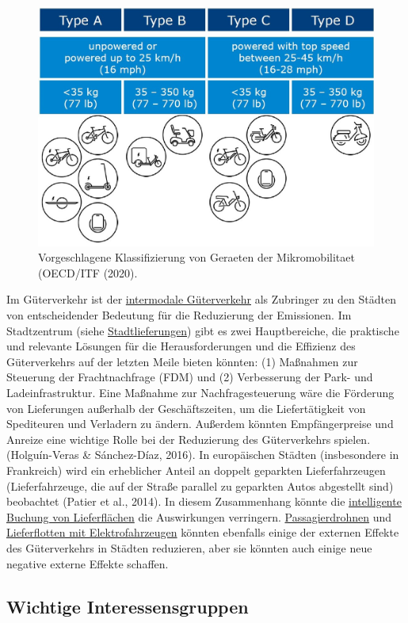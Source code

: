 \documentclass[
]{book}
\begin{document}
\begin{figure}
\includegraphics[width=0.5\linewidth]{image/micromobility_classes} \caption{Vorgeschlagene Klassifizierung von Geraeten der Mikromobilitaet (OECD/ITF (2020).}\label{fig:unnamed-chunk-24}
\end{figure}

Im Güterverkehr ist der \protect\hyperlink{intermodal_freight}{intermodale Güterverkehr} als Zubringer zu den Städten von entscheidender Bedeutung für die Reduzierung der Emissionen. Im Stadtzentrum (siehe \protect\hyperlink{urban_delivery}{Stadtlieferungen}) gibt es zwei Hauptbereiche, die praktische und relevante Lösungen für die Herausforderungen und die Effizienz des Güterverkehrs auf der letzten Meile bieten könnten: (1) Maßnahmen zur Steuerung der Frachtnachfrage (FDM) und (2) Verbesserung der Park- und Ladeinfrastruktur. Eine Maßnahme zur Nachfragesteuerung wäre die Förderung von Lieferungen außerhalb der Geschäftszeiten, um die Liefertätigkeit von Spediteuren und Verladern zu ändern. Außerdem könnten Empfängerpreise und Anreize eine wichtige Rolle bei der Reduzierung des Güterverkehrs spielen. (Holguín-Veras \& Sánchez-Díaz, 2016). In europäischen Städten (insbesondere in Frankreich) wird ein erheblicher Anteil an doppelt geparkten Lieferfahrzeugen (Lieferfahrzeuge, die auf der Straße parallel zu geparkten Autos abgestellt sind) beobachtet (Patier et al., 2014). In diesem Zusammenhang könnte die \protect\hyperlink{space_book}{intelligente Buchung von Lieferflächen} die Auswirkungen verringern. \protect\hyperlink{passenger_drones}{Passagierdrohnen} und \protect\hyperlink{electric_delivery_fleets}{Lieferflotten mit Elektrofahrzeugen} könnten ebenfalls einige der externen Effekte des Güterverkehrs in Städten reduzieren, aber sie könnten auch einige neue negative externe Effekte schaffen.

\hypertarget{wichtige-interessensgruppen-22}{%
\subsection*{Wichtige Interessensgruppen}\label{wichtige-interessensgruppen-22}}
\end{document}
